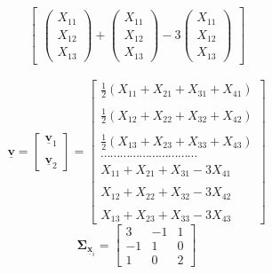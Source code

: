 \documentclass[
]{book}
\theoremstyle{definition}
\theoremstyle{definition}
\theoremstyle{definition}
\theoremstyle{definition}
\theoremstyle{remark}
\begin{document}
\begin{align*}
\begin{bmatrix}
\begin{pmatrix}
X_{11} \\ X_{12} \\ X_{13}
\end{pmatrix}+
\begin{pmatrix}
X_{11} \\ X_{12} \\ X_{13}
\end{pmatrix}-3\begin{pmatrix}
X_{11} \\ X_{12} \\ X_{13}
\end{pmatrix}
\end{bmatrix}
\end{align*}

\[
\underline{\mathbf{v}}=\begin{bmatrix}
\underline{\mathbf{v}}_1 \\ \\\underline{\mathbf{v}}_2
\end{bmatrix}=\begin{bmatrix}
\frac{1}{2} \left(X_{11} + X_{21} + X_{31}+X_{41} \right) \\ 
\\
\frac{1}{2} \left(X_{12} + X_{22} + X_{32} +X_{42} \right)\\ 
\\
\frac{1}{2} \left(X_{13} + X_{23} + X_{33} + X_{43}\right)\\
\cdots \cdots \cdots \cdots \cdots \cdots \cdots \cdots \cdots \cdots  
\\
X_{11} + X_{21} + X_{31}-3X_{41} \\
\\
X_{12} + X_{22} + X_{32} -3X_{42}  \\ 
\\
X_{13} + X_{23} + X_{33} -3X_{43}
\end{bmatrix}
\]
\[
\mathbf{\Sigma}_{\underline{\mathbf{x}}_i}=\begin{bmatrix}
3 & -1 & 1\\ -1 & 1 &0 \\ 1 & 0& 2
\end{bmatrix}
\]
\end{document}
